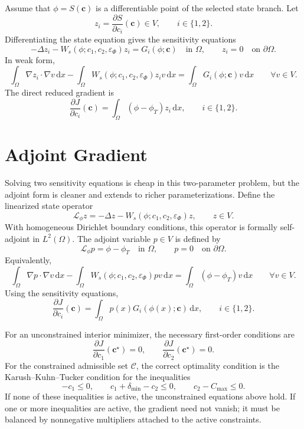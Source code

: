\documentclass[11pt]{article}
\newcommand{\dd}{\,\mathrm d}
\newcommand{\OmegaD}{\Omega}
\newcommand{\V}{V}
\newcommand{\W}{W}
\newcommand{\cvec}{\bm c}
\newcommand{\phit}{\phi_T}
\newcommand{\epsp}{\varepsilon_\Phi}
\begin{document}
Assume that \(\phi=S(\cvec)\) is a differentiable point of the selected state
branch.  Let
\[
  z_i = \frac{\partial S}{\partial c_i}(\cvec)\in\V,
  \qquad i\in\{1,2\}.
\]
Differentiating the state equation gives the sensitivity equations
\[
  -\Delta z_i
  -
  \W_s(\phi;c_1,c_2,\epsp) z_i
  =
  G_i(\phi;\cvec)
  \quad \text{in } \OmegaD,
  \qquad
  z_i=0
  \quad \text{on } \partial\OmegaD.
\]
In weak form,
\[
  \int_{\OmegaD}\nabla z_i\cdot\nabla v\dd x
  -
  \int_{\OmegaD}
    \W_s(\phi;c_1,c_2,\epsp) z_i v
  \dd x
  =
  \int_{\OmegaD}G_i(\phi;\cvec)v\dd x
  \qquad
  \forall v\in\V.
\]
The direct reduced gradient is
\[
  \frac{\partial J}{\partial c_i}(\cvec)
  =
  \int_{\OmegaD}(\phi-\phit)z_i\dd x,
  \qquad i\in\{1,2\}.
\]

\section{Adjoint Gradient}

Solving two sensitivity equations is cheap in this two-parameter problem, but
the adjoint form is cleaner and extends to richer parameterizations.  Define
the linearized state operator
\[
  \mathcal L_\phi z
  =
  -\Delta z
  -
  \W_s(\phi;c_1,c_2,\epsp)z,
  \qquad z\in\V.
\]
With homogeneous Dirichlet boundary conditions, this operator is formally
self-adjoint in \(L^2(\OmegaD)\).  The adjoint variable \(p\in\V\) is defined
by
\[
  \mathcal L_\phi p = \phi-\phit
  \quad \text{in } \OmegaD,
  \qquad
  p=0
  \quad \text{on } \partial\OmegaD.
\]
Equivalently,
\[
  \int_{\OmegaD}\nabla p\cdot\nabla v\dd x
  -
  \int_{\OmegaD}
    \W_s(\phi;c_1,c_2,\epsp)p v
  \dd x
  =
  \int_{\OmegaD}(\phi-\phit)v\dd x
  \qquad
  \forall v\in\V.
\]
Using the sensitivity equations,
\[
  \boxed{
  \frac{\partial J}{\partial c_i}(\cvec)
  =
  \int_{\OmegaD} p(x)G_i(\phi(x);\cvec)\dd x,
  \qquad i\in\{1,2\}.
  }
\]

For an unconstrained interior minimizer, the necessary first-order conditions
are
\[
  \frac{\partial J}{\partial c_1}(\cvec^\star)=0,
  \qquad
  \frac{\partial J}{\partial c_2}(\cvec^\star)=0.
\]
For the constrained admissible set \(\mathcal C\), the correct optimality
condition is the Karush--Kuhn--Tucker condition for the inequalities
\[
  -c_1\le 0,\qquad
  c_1+\delta_{\min}-c_2\le 0,\qquad
  c_2-C_{\max}\le 0.
\]
If none of these inequalities is active, the unconstrained equations above
hold.  If one or more inequalities are active, the gradient need not vanish;
it must be balanced by nonnegative multipliers attached to the active
constraints.
\end{document}
